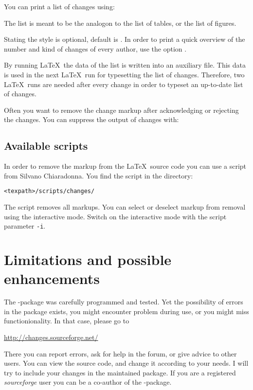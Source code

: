 
You can print a list of changes using:


The list is meant to be the analogon to the list of tables, or the list of figures.

Stating the style is optional, default is .
In order to print a quick overview of the number and kind of changes of every author, use the option .

By running \LaTeX\ the data of the list is written into an auxiliary file.
This data is used in the next \LaTeX\ run for typesetting the list of changes.
Therefore, two \LaTeX\ runs are needed after every change in order to typeset an up-to-date list of changes.



Often you want to remove the change markup after acknowledging or rejecting the changes.
You can suppress the output of changes with:


\subsection{Available scripts}

In order to remove the markup from the \LaTeX\ source code  you can use a script from Silvano Chiaradonna.
You find the script in the directory:

\texttt{<texpath>/scripts/changes/}

The script removes all markups.
You can select or deselect markup from removal using the interactive mode.
Switch on the interactive mode with the script parameter \texttt{-i}.

\section{Limitations and possible enhancements}
\label{sec:limitations}

The -package was carefully programmed and tested.
Yet the possibility of errors in the package exists, you might encounter problem during use, or you might miss functionionality.
In that case, please go to

\url{http://changes.sourceforge.net/}

There you can report errors, ask for help in the forum, or give advice to other users.
You can view the source code, and change it according to your needs.
I will try to include your changes in the maintained package.
If you are a registered \emph{sourceforge} user you can be a co-author of the -package.

